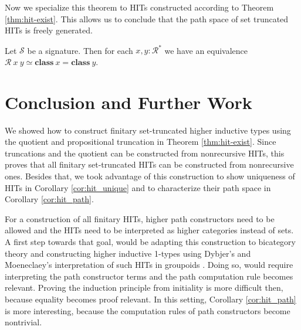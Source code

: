 \documentclass[9pt]{entcs}
\newcommand{\constructor}[1]{\mathbf{#1}}
\newcommand{\0}{\textbf{0}} %
\newcommand{\1}{\textbf{1}} %
\newcommand{\weq}{\simeq} %
\newcommand{\classof}{\constructor{class}} %
\newcommand{\sig}{\mathcal{S}} %
\newcommand{\CR}{\mathcal{R}^*} %
\newcommand{\CRR}{\mathcal{R}} %
\begin{document}
Now we specialize this theorem to HITs constructed according to Theorem \ref{thm:hit-exist}.
This allows us to conclude that the path space of set truncated HITs is freely generated.

\begin{corollary}
\label{cor:hit_path}
Let $\sig$ be a signature.
Then for each $x, y : \CR$ we have an equivalence $\CRR \> x \> y \weq \classof \> x = \classof \> y$.
\end{corollary}

\section{Conclusion and Further Work}
\label{sec:conclusion}
We showed how to construct finitary set-truncated higher inductive types using the quotient and propositional truncation in Theorem \ref{thm:hit-exist}.
Since truncations and the quotient can be constructed from nonrecursive HITs, this proves that all finitary set-truncated HITs can be constructed from nonrecursive ones.
Besides that, we took advantage of this construction to show uniqueness of HITs in Corollary \ref{cor:hit_unique} and to characterize their path space in Corollary \ref{cor:hit_path}.

For a construction of all finitary HITs, higher path constructors need to be allowed and the HITs need to be interpreted as higher categories instead of sets.
A first step towards that goal, would be adapting this construction to bicategory theory \cite{ahrens2019bicategories,capriotti2017univalent} and constructing higher inductive 1-types using Dybjer's and Moeneclaey's interpretation of such HITs in groupoids \cite{DybjerM18}.
Doing so, would require interpreting the path constructor terms and the path computation rule becomes relevant.
Proving the induction principle from initiality is more difficult then, because equality becomes proof relevant.
In this setting, Corollary \ref{cor:hit_path} is more interesting, because the computation rules of path constructors become nontrivial.
\end{document}

